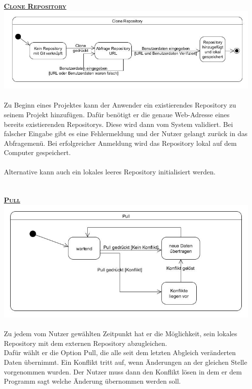 \documentclass[a4paper]{article}
\begin{document}
\newpage	
\underline{\textbf{\textsc{\hypertarget{target}{Clone Repository}}}} \\
\includegraphics[width=\textwidth]{Clone.jpg}\\\\
Zu Beginn eines Projektes kann der Anwender ein existierendes Repository zu seinem Projekt hinzufügen.
Dafür benötigt er die genaue Web-Adresse eines bereits existierenden Repositorys. Diese wird dann vom System validiert. Bei falscher Eingabe gibt es eine Fehlermeldung und der Nutzer gelangt zurück in das Abfragemenü.
Bei erfolgreicher Anmeldung wird das Repository lokal auf dem Computer gespeichert. \\\\
Alternative kann auch ein lokales leeres Repository initialisiert werden.\\\\\\
\underline{\textbf{\textsc{Pull}}}\\
\includegraphics[width=\textwidth]{Pull.jpg}\\\\
Zu jedem vom Nutzer gewählten Zeitpunkt hat er die Möglichkeit, sein lokales Repository mit dem externen Repository abzugleichen. \\
Dafür wählt er die Option Pull, die alle seit dem letzten Abgleich veränderten Daten übernimmt.
Ein Konflikt tritt auf, wenn Änderungen an der gleichen Stelle vorgenommen wurden.
Der Nutzer muss dann den Konflikt lösen in dem er dem Programm sagt welche Änderung übernommen werden soll.
\end{document}
